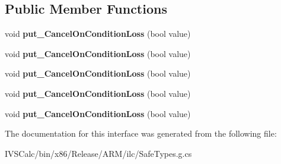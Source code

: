 \subsection*{Public Member Functions}
\begin{DoxyCompactItemize}
\item 
\mbox{\label{interface_windows_1_1_application_model_1_1_background_1_1_i_background_task_builder2_a0b0d8c1dee2e81992e7948ca4f618697}} 
void {\bfseries put\+\_\+\+Cancel\+On\+Condition\+Loss} (bool value)
\item 
\mbox{\label{interface_windows_1_1_application_model_1_1_background_1_1_i_background_task_builder2_a0b0d8c1dee2e81992e7948ca4f618697}} 
void {\bfseries put\+\_\+\+Cancel\+On\+Condition\+Loss} (bool value)
\item 
\mbox{\label{interface_windows_1_1_application_model_1_1_background_1_1_i_background_task_builder2_a0b0d8c1dee2e81992e7948ca4f618697}} 
void {\bfseries put\+\_\+\+Cancel\+On\+Condition\+Loss} (bool value)
\item 
\mbox{\label{interface_windows_1_1_application_model_1_1_background_1_1_i_background_task_builder2_a0b0d8c1dee2e81992e7948ca4f618697}} 
void {\bfseries put\+\_\+\+Cancel\+On\+Condition\+Loss} (bool value)
\item 
\mbox{\label{interface_windows_1_1_application_model_1_1_background_1_1_i_background_task_builder2_a0b0d8c1dee2e81992e7948ca4f618697}} 
void {\bfseries put\+\_\+\+Cancel\+On\+Condition\+Loss} (bool value)
\end{DoxyCompactItemize}


The documentation for this interface was generated from the following file\+:\begin{DoxyCompactItemize}
\item 
I\+V\+S\+Calc/bin/x86/\+Release/\+A\+R\+M/ilc/Safe\+Types.\+g.\+cs\end{DoxyCompactItemize}
